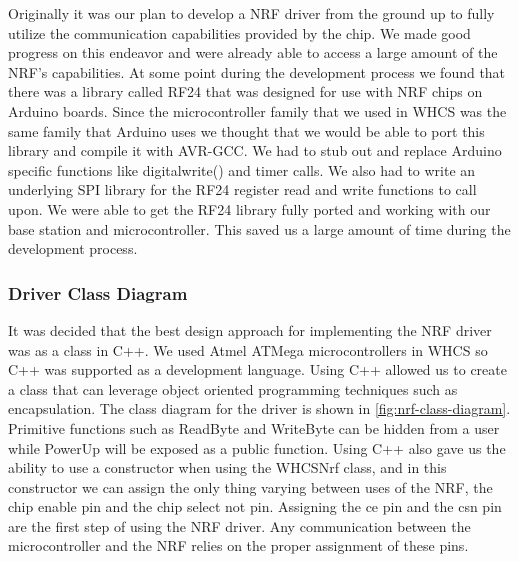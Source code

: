Originally it was our plan to develop a NRF driver from the ground up to fully utilize the communication capabilities provided by the chip. We made good progress on this endeavor and were already able to access a large amount of the NRF's capabilities. At some point during the development process we found that there was a library called RF24 that was designed for use with NRF chips on Arduino boards. Since the microcontroller family that we used in WHCS was the same family that Arduino uses we thought that we would be able to port this library and compile it with AVR-GCC. We had to stub out and replace Arduino specific functions like digitalwrite() and timer calls. We also had to write an underlying SPI library for the RF24 register read and write functions to call upon. We were able to get the RF24 library fully ported and working with our base station and microcontroller. This saved us a large amount of time during the development process.

\subsubsection{Driver Class Diagram}
It was decided that the best design approach for implementing the NRF driver
was as a class in C++. We used Atmel ATMega microcontrollers in WHCS so C++
was supported as a development language. Using C++ allowed us to create a class
that can leverage object oriented programming techniques such as encapsulation.
The class diagram for the driver is shown in \autoref{fig:nrf-class-diagram}.
Primitive functions such as ReadByte and WriteByte can be hidden from a user
while PowerUp will be exposed as a public function. Using C++ also gave us the
ability to use a constructor when using the WHCSNrf class, and in this
constructor we can assign the only thing varying between uses of the NRF, the
chip enable pin and the chip select not pin. Assigning the ce pin and the csn
pin are the first step of using the NRF driver. Any communication between the
microcontroller and the NRF relies on the proper assignment of these pins.


